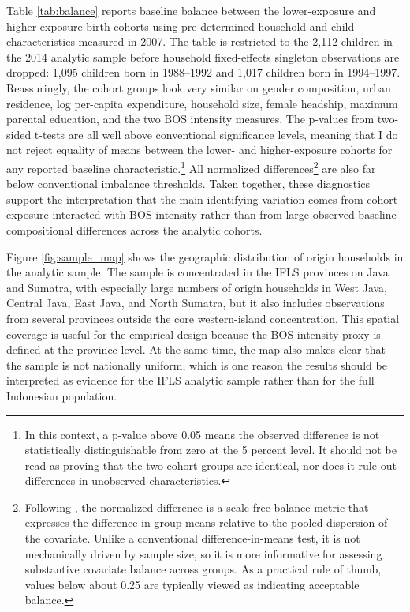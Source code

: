 \documentclass[a4paper, 12pt]{article}
\begin{document}
\begin{doublespacing}
Table \ref{tab:balance} reports baseline balance between the lower-exposure and higher-exposure birth cohorts using pre-determined household and child characteristics measured in 2007. The table is restricted to the 2,112 children in the 2014 analytic sample before household fixed-effects singleton observations are dropped: 1,095 children born in 1988--1992 and 1,017 children born in 1994--1997. Reassuringly, the cohort groups look very similar on gender composition, urban residence, log per-capita expenditure, household size, female headship, maximum parental education, and the two BOS intensity measures. The p-values from two-sided t-tests are all well above conventional significance levels, meaning that I do not reject equality of means between the lower- and higher-exposure cohorts for any reported baseline characteristic.\footnote{In this context, a p-value above 0.05 means the observed difference is not statistically distinguishable from zero at the 5 percent level. It should not be read as proving that the two cohort groups are identical, nor does it rule out differences in unobserved characteristics.} All normalized differences\footnote{Following \citet{ImbensWooldridge2009}, the normalized difference is a scale-free balance metric that expresses the difference in group means relative to the pooled dispersion of the covariate. Unlike a conventional difference-in-means test, it is not mechanically driven by sample size, so it is more informative for assessing substantive covariate balance across groups. As a practical rule of thumb, values below about 0.25 are typically viewed as indicating acceptable balance.} are also far below conventional imbalance thresholds. Taken together, these diagnostics support the interpretation that the main identifying variation comes from cohort exposure interacted with BOS intensity rather than from large observed baseline compositional differences across the analytic cohorts.


Figure \ref{fig:sample_map} shows the geographic distribution of origin households in the analytic sample. The sample is concentrated in the IFLS provinces on Java and Sumatra, with especially large numbers of origin households in West Java, Central Java, East Java, and North Sumatra, but it also includes observations from several provinces outside the core western-island concentration. This spatial coverage is useful for the empirical design because the BOS intensity proxy is defined at the province level. At the same time, the map also makes clear that the sample is not nationally uniform, which is one reason the results should be interpreted as evidence for the IFLS analytic sample rather than for the full Indonesian population.


\end{doublespacing}
\end{document}
